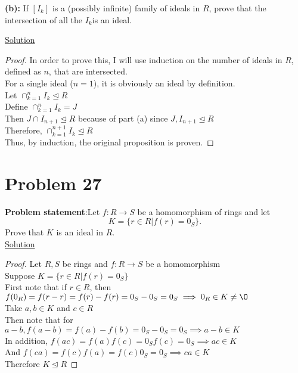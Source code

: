 \documentclass{article} %
\begin{document}
\textbf{(b): }If $[I_k]$ is a (possibly infinite) family of ideals in $R$, prove that the intersection of all the $I_k$is an ideal.
\\
\begin{addmargin}[1em]{0em}
\underline{Solution}
\begin{addmargin}[1em]{0em}
\begin{proof}
In order to prove this, I will use induction on the number of ideals in $R$, defined as $n$, that are intersected.
\\  For a single ideal ($n = 1$), it is obviously an ideal by definition.
\\  Let $\cap_{k=1}^{n}I_k \unlhd R$
\\  Define $\cap_{k=1}^{n}I_k = J$
\\Then $J \cap I_{n+1} \unlhd R$ because of part (a) since $J, I_{n+1} \unlhd R$
\\Therefore, $\cap_{k=1}^{n+1}I_k \unlhd R$
\\Thus, by induction, the original proposition is proven.
\end{proof}
\end{addmargin}
\end{addmargin}
\newpage

\section*{Problem 27}


\textbf{Problem statement}:Let $f:R \rightarrow S$ be a homomorphism of rings and let \[K=\{r \in R|f(r)=0_S\}.\] Prove that $K$ is an ideal in $R$. 
\\

\underline{Solution}
\begin{addmargin}[1em]{0em}
\begin{proof}
Let $R,S$ be rings and $f:R \rightarrow S$ be a homomorphism
\\Suppose $K = \{r \in R|f(r) = 0_S\}$
\\First note that if $r \in R$, then $f(0_R) = f(r-r) = f(r)-f(r) = 0_S - 0_S = 0_S \implies 0_R \in K \neq \O$
\\Take $a, b \in K$ and $c \in R$
\\Then note that for $a - b, f(a-b) = f(a) - f(b) = 0_S - 0_S = 0_S \implies a-b \in K$
\\In addition, $f(ac) = f(a)f(c) = 0_Sf(c) = 0_S \implies ac \in K$
\\And $f(ca) = f(c)f(a) = f(c)0_S = 0_S \implies ca \in K$
\\Therefore $K \unlhd R$
\end{proof}
\end{addmargin}
\end{document}
